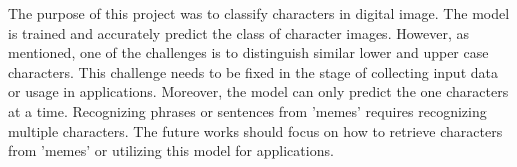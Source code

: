 The purpose of this project was to classify characters in digital image. The model is trained and accurately predict the class
of character images. However, as mentioned, one of the challenges is to distinguish similar lower and upper case characters. This
challenge needs to be fixed in the stage of collecting input data or usage in applications. Moreover, the model can only predict
the one characters at a time. Recognizing phrases or sentences from 'memes' requires recognizing multiple characters. The future works
should focus on how to retrieve characters from 'memes' or utilizing this model for applications.